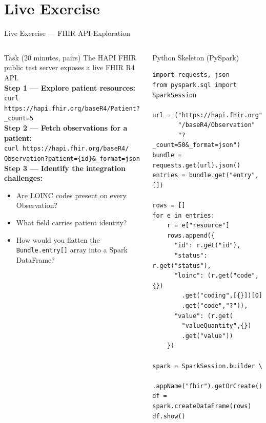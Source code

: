 \documentclass[aspectratio=169,10pt]{beamer}
\begin{document}
\section{Live Exercise}

\begin{frame}[fragile]{Live Exercise — FHIR API Exploration}
  \begin{columns}[T]
      \begin{block}{Task (20 minutes, pairs)}
        The HAPI FHIR public test server exposes a live FHIR R4 API.\\[5pt]
        \textbf{Step 1 — Explore patient resources:}\\
        \texttt{\scriptsize curl https://hapi.fhir.org/baseR4/Patient?\_count=5}\\[4pt]
        \textbf{Step 2 — Fetch observations for a patient:}\\
        \texttt{\scriptsize curl https://hapi.fhir.org/baseR4/\\
        Observation?patient=\{id\}\&\_format=json}\\[4pt]
        \textbf{Step 3 — Identify the integration challenges:}
        \begin{itemize}
          \item Are LOINC codes present on every Observation?
          \item What field carries patient identity?
          \item How would you flatten the \texttt{Bundle.entry[]} array
                into a Spark DataFrame?
        \end{itemize}
      \end{block}

      \begin{exampleblock}{Python Skeleton (PySpark)}
        \scriptsize
        \begin{verbatim}
import requests, json
from pyspark.sql import SparkSession

url = ("https://hapi.fhir.org"
       "/baseR4/Observation"
       "?_count=50&_format=json")
bundle = requests.get(url).json()
entries = bundle.get("entry", [])

rows = []
for e in entries:
    r = e["resource"]
    rows.append({
      "id": r.get("id"),
      "status": r.get("status"),
      "loinc": (r.get("code",{})
        .get("coding",[{}])[0]
        .get("code","?")),
      "value": (r.get(
        "valueQuantity",{})
        .get("value"))
    })

spark = SparkSession.builder \
        .appName("fhir").getOrCreate()
df = spark.createDataFrame(rows)
df.show()
        \end{verbatim}
      \end{exampleblock}
  \end{columns}
\end{frame}
\end{document}
